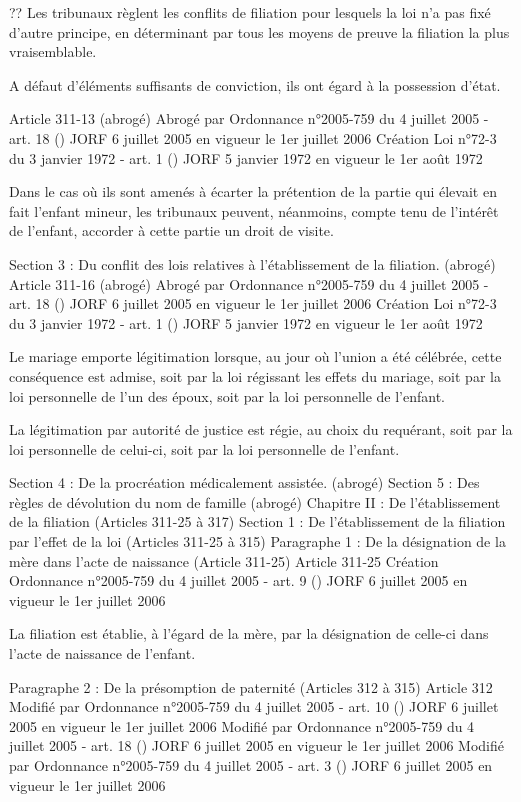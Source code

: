 \documentclass[
  12pt,
]{book}
\begin{document}
\begin{encadre}{??}
Les tribunaux règlent les conflits de filiation pour lesquels la loi n'a pas fixé d'autre principe, en déterminant par tous les moyens de preuve la filiation la plus vraisemblable.

A défaut d'éléments suffisants de conviction, ils ont égard à la possession d'état.

Article 311-13 (abrogé)
Abrogé par Ordonnance n°2005-759 du 4 juillet 2005 - art. 18 () JORF 6 juillet 2005 en vigueur le 1er juillet 2006
Création Loi n°72-3 du 3 janvier 1972 - art. 1 () JORF 5 janvier 1972 en vigueur le 1er août 1972

Dans le cas où ils sont amenés à écarter la prétention de la partie qui élevait en fait l'enfant mineur, les tribunaux peuvent, néanmoins, compte tenu de l'intérêt de l'enfant, accorder à cette partie un droit de visite.

Section 3 : Du conflit des lois relatives à l'établissement de la filiation. (abrogé)
Article 311-16 (abrogé)
Abrogé par Ordonnance n°2005-759 du 4 juillet 2005 - art. 18 () JORF 6 juillet 2005 en vigueur le 1er juillet 2006
Création Loi n°72-3 du 3 janvier 1972 - art. 1 () JORF 5 janvier 1972 en vigueur le 1er août 1972

Le mariage emporte légitimation lorsque, au jour où l'union a été célébrée, cette conséquence est admise, soit par la loi régissant les effets du mariage, soit par la loi personnelle de l'un des époux, soit par la loi personnelle de l'enfant.

La légitimation par autorité de justice est régie, au choix du requérant, soit par la loi personnelle de celui-ci, soit par la loi personnelle de l'enfant.

Section 4 : De la procréation médicalement assistée. (abrogé)
Section 5 : Des règles de dévolution du nom de famille (abrogé)
Chapitre II : De l'établissement de la filiation (Articles 311-25 à 317)
Section 1 : De l'établissement de la filiation par l'effet de la loi (Articles 311-25 à 315)
Paragraphe 1 : De la désignation de la mère dans l'acte de naissance (Article 311-25)
Article 311-25
Création Ordonnance n°2005-759 du 4 juillet 2005 - art. 9 () JORF 6 juillet 2005 en vigueur le 1er juillet 2006

La filiation est établie, à l'égard de la mère, par la désignation de celle-ci dans l'acte de naissance de l'enfant.

Paragraphe 2 : De la présomption de paternité (Articles 312 à 315)
Article 312
Modifié par Ordonnance n°2005-759 du 4 juillet 2005 - art. 10 () JORF 6 juillet 2005 en vigueur le 1er juillet 2006
Modifié par Ordonnance n°2005-759 du 4 juillet 2005 - art. 18 () JORF 6 juillet 2005 en vigueur le 1er juillet 2006
Modifié par Ordonnance n°2005-759 du 4 juillet 2005 - art. 3 () JORF 6 juillet 2005 en vigueur le 1er juillet 2006


\end{encadre}
\end{document}
